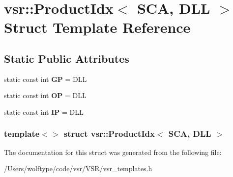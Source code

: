 \hypertarget{structvsr_1_1_product_idx_3_01_s_c_a_00_01_d_l_l_01_4}{\section{vsr\-:\-:Product\-Idx$<$ S\-C\-A, D\-L\-L $>$ Struct Template Reference}
\label{structvsr_1_1_product_idx_3_01_s_c_a_00_01_d_l_l_01_4}
}
\subsection*{Static Public Attributes}
\begin{DoxyCompactItemize}
\item 
\hypertarget{structvsr_1_1_product_idx_3_01_s_c_a_00_01_d_l_l_01_4_a29a50de3586c75332113d02ad35f7beb}{static const int {\bfseries G\-P} = D\-L\-L}\label{structvsr_1_1_product_idx_3_01_s_c_a_00_01_d_l_l_01_4_a29a50de3586c75332113d02ad35f7beb}

\item 
\hypertarget{structvsr_1_1_product_idx_3_01_s_c_a_00_01_d_l_l_01_4_abffec120f46ff740ebc720476f9461ca}{static const int {\bfseries O\-P} = D\-L\-L}\label{structvsr_1_1_product_idx_3_01_s_c_a_00_01_d_l_l_01_4_abffec120f46ff740ebc720476f9461ca}

\item 
\hypertarget{structvsr_1_1_product_idx_3_01_s_c_a_00_01_d_l_l_01_4_a1f49d16f6ea73ed5751a8bf757114fd7}{static const int {\bfseries I\-P} = D\-L\-L}\label{structvsr_1_1_product_idx_3_01_s_c_a_00_01_d_l_l_01_4_a1f49d16f6ea73ed5751a8bf757114fd7}

\end{DoxyCompactItemize}
\subsubsection*{template$<$$>$ struct vsr\-::\-Product\-Idx$<$ S\-C\-A, D\-L\-L $>$}



The documentation for this struct was generated from the following file\-:\begin{DoxyCompactItemize}
\item 
/\-Users/wolftype/code/vsr/\-V\-S\-R/vsr\-\_\-templates.\-h\end{DoxyCompactItemize}
